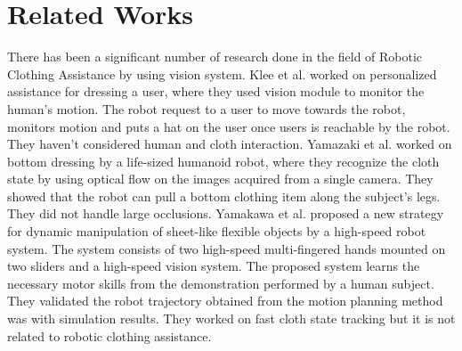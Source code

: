 \documentclass[sigconf]{acmart}
\begin{document}
\section{Related Works}
\label{sec:related_works}
There has been a significant number of research done in the field of Robotic Clothing Assistance by using vision system. Klee et al. \cite{klee2015personalized} worked on personalized assistance for dressing a user, where they used vision module to monitor the human's motion. The robot request to a user to move towards the robot, monitors motion and puts a hat on the user once users is reachable by the robot. They haven't considered human and cloth interaction. Yamazaki et al. \cite{yamazaki2013method, yamazaki2014bottom}  worked on bottom dressing by a life-sized humanoid robot, where they recognize the cloth state by using optical flow on the images acquired from a single camera. They showed that the robot can pull a bottom clothing item along the subject's legs. They did not handle large occlusions. Yamakawa et al. \cite{yamakawa2011dynamic} proposed a new strategy for dynamic manipulation of sheet-like flexible objects by a high-speed robot system. The system consists of two high-speed multi-fingered hands mounted on two sliders and a high-speed vision system. The proposed system learns the necessary motor skills from the demonstration performed by a human subject. They validated the robot trajectory obtained from the motion planning method was with simulation results. They worked on fast cloth state tracking but it is not related to robotic clothing assistance.
\end{document}
